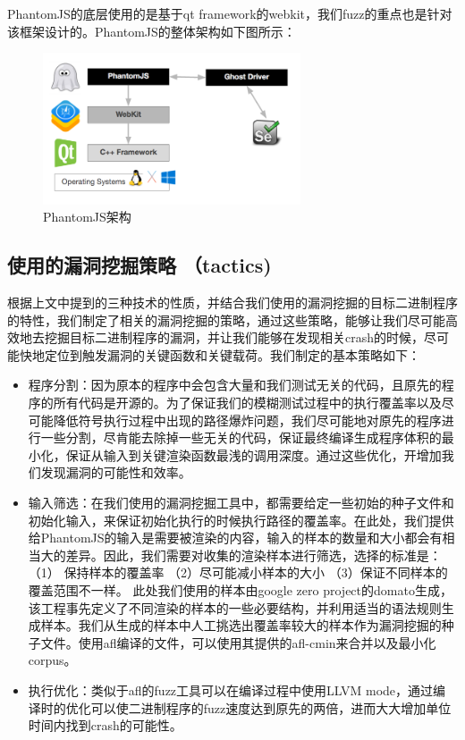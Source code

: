 \documentclass[doctor,privacy,twoside]{buaa_mac}
\begin{document}
PhantomJS的底层使用的是基于qt framework的webkit，我们fuzz的重点也是针对该框架设计的。PhantomJS的整体架构如下图所示：


\centerline{}
\begin{figure}[!h]
  \centering
  \includegraphics[width=0.68\textwidth]{images/phantomjs_arch.png}
  \caption{PhantomJS架构}
  \label{fig:logo}
\end{figure}
\centerline{}


\subsection{使用的漏洞挖掘策略 （tactics)}
根据上文中提到的三种技术的性质，并结合我们使用的漏洞挖掘的目标二进制程序的特性，我们制定了相关的漏洞挖掘的策略，通过这些策略，能够让我们尽可能高效地去挖掘目标二进制程序的漏洞，并让我们能够在发现相关crash的时候，尽可能快地定位到触发漏洞的关键函数和关键载荷。我们制定的基本策略如下：


\begin{itemize}
\item 程序分割：因为原本的程序中会包含大量和我们测试无关的代码，且原先的程序的所有代码是开源的。为了保证我们的模糊测试过程中的执行覆盖率以及尽可能降低符号执行过程中出现的路径爆炸问题，我们尽可能地对原先的程序进行一些分割，尽肯能去除掉一些无关的代码，保证最终编译生成程序体积的最小化，保证从输入到关键渲染函数最浅的调用深度。通过这些优化，开增加我们发现漏洞的可能性和效率。

\item 输入筛选：在我们使用的漏洞挖掘工具中，都需要给定一些初始的种子文件和初始化输入，来保证初始化执行的时候执行路径的覆盖率。在此处，我们提供给PhantomJS的输入是需要被渲染的内容，输入的样本的数量和大小都会有相当大的差异。因此，我们需要对收集的渲染样本进行筛选，选择的标准是：（1） 保持样本的覆盖率 （2）尽可能减小样本的大小 （3）保证不同样本的覆盖范围不一样。 此处我们使用的样本由google zero project的domato生成，该工程事先定义了不同渲染的样本的一些必要结构，并利用适当的语法规则生成样本。我们从生成的样本中人工挑选出覆盖率较大的样本作为漏洞挖掘的种子文件。使用afl编译的文件，可以使用其提供的afl-cmin来合并以及最小化corpus。

\item 执行优化：类似于afl的fuzz工具可以在编译过程中使用LLVM mode，通过编译时的优化可以使二进制程序的fuzz速度达到原先的两倍，进而大大增加单位时间内找到crash的可能性。
\end{itemize}
\end{document}

